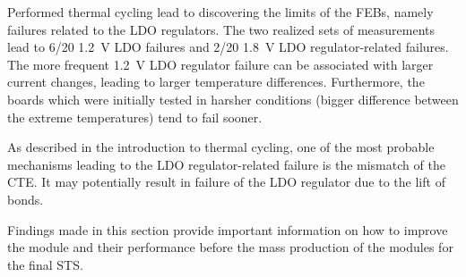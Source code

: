 Performed thermal cycling lead to discovering the limits of the \glspl{FEB}, namely failures related to the \gls{LDO} regulators. The two realized sets of measurements lead to 6/20 1.2~V \gls{LDO} failures and 2/20 1.8~V \gls{LDO} regulator-related failures. The more frequent 1.2~V \gls{LDO} regulator failure can be associated with larger current changes, leading to larger temperature differences. Furthermore, the boards which were initially tested in harsher conditions (bigger difference between the extreme temperatures) tend to fail sooner.

As described in the introduction to thermal cycling, one of the most probable mechanisms leading to the \gls{LDO} regulator-related failure is the mismatch of the \gls{CTE}. It may potentially result in failure of the \gls{LDO} regulator due to the lift of bonds.

Findings made in this section provide important information on how to improve the module and their performance before the mass production of the modules for the final \gls{STS}. 



\newpage